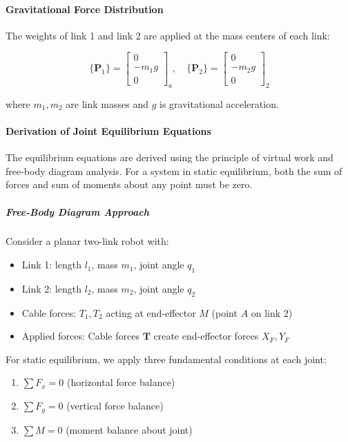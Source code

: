 \paragraph{Gravitational Force Distribution}

The weights of link 1 and link 2 are applied at the mass centers of each link:

\begin{equation}
\{\mathbf{P}_1\} = \begin{bmatrix} 0 \\ -m_1 g \\ 0 \end{bmatrix}_a, \quad \{\mathbf{P}_2\} = \begin{bmatrix} 0 \\ -m_2 g \\ 0 \end{bmatrix}_2
\end{equation}

where $m_1, m_2$ are link masses and $g$ is gravitational acceleration.

\paragraph{Derivation of Joint Equilibrium Equations}

The equilibrium equations are derived using the principle of virtual work and free-body diagram analysis. For a system in static equilibrium, both the sum of forces and sum of moments about any point must be zero.

\subparagraph{Free-Body Diagram Approach}

Consider a planar two-link robot with:
\begin{itemize}
    \item Link 1: length $l_1$, mass $m_1$, joint angle $q_1$
    \item Link 2: length $l_2$, mass $m_2$, joint angle $q_2$  
    \item Cable forces: $T_1, T_2$ acting at end-effector $M$ (point $A$ on link 2)
    \item Applied forces: Cable forces $\mathbf{T}$ create end-effector forces $X_F, Y_F$
\end{itemize}

For static equilibrium, we apply three fundamental conditions at each joint:

\begin{enumerate}
    \item $\sum F_x = 0$ (horizontal force balance)
    \item $\sum F_y = 0$ (vertical force balance)
    \item $\sum M = 0$ (moment balance about joint)
\end{enumerate}

